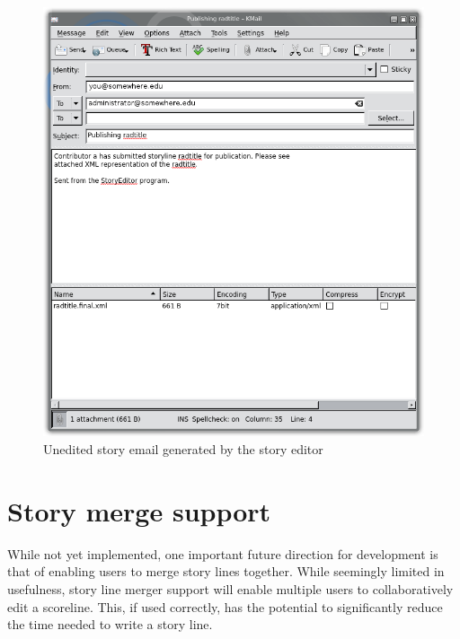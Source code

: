 \documentclass[12pt,letterpaper]{article}
\begin{document}
\begin{figure}
    \begin{center}
        \includegraphics[scale=1]{publicationemail.png}
    \end{center}
    \caption{Unedited story email generated by the story editor}
\end{figure}

\section{Story merge support}

While not yet implemented, one important future direction for development is that of enabling
users to merge story lines together. While seemingly limited in usefulness, story line merger
support will enable multiple users to collaboratively edit a scoreline. This, if used correctly, has
the potential to significantly reduce the time needed to write a story line.
\end{document}
